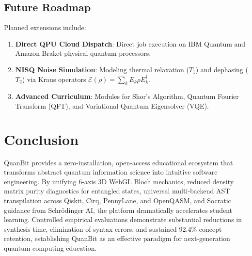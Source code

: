 \documentclass[conference]{IEEEtran}
\begin{document}
\subsection{Future Roadmap}
Planned extensions include:
\begin{enumerate}[leftmargin=*,itemsep=2pt]
    \item \textbf{Direct QPU Cloud Dispatch}: Direct job execution on IBM Quantum and Amazon Braket physical quantum processors.
    \item \textbf{NISQ Noise Simulation}: Modeling thermal relaxation ($T_1$) and dephasing ($T_2$) via Kraus operators $\mathcal{E}(\rho) = \sum_k E_k \rho E_k^\dagger$.
    \item \textbf{Advanced Curriculum}: Modules for Shor's Algorithm, Quantum Fourier Transform (QFT), and Variational Quantum Eigensolver (VQE).
\end{enumerate}

\section{Conclusion}
\label{sec:conclusion}

QuanBit provides a zero-installation, open-access educational ecosystem that transforms abstract quantum information science into intuitive software engineering. By unifying 6-axis 3D WebGL Bloch mechanics, reduced density matrix purity diagnostics for entangled states, universal multi-backend AST transpilation across Qiskit, Cirq, PennyLane, and OpenQASM, and Socratic guidance from Schr{\"o}dinger AI, the platform dramatically accelerates student learning. Controlled empirical evaluations demonstrate substantial reductions in synthesis time, elimination of syntax errors, and sustained 92.4\% concept retention, establishing QuanBit as an effective paradigm for next-generation quantum computing education.
\end{document}
